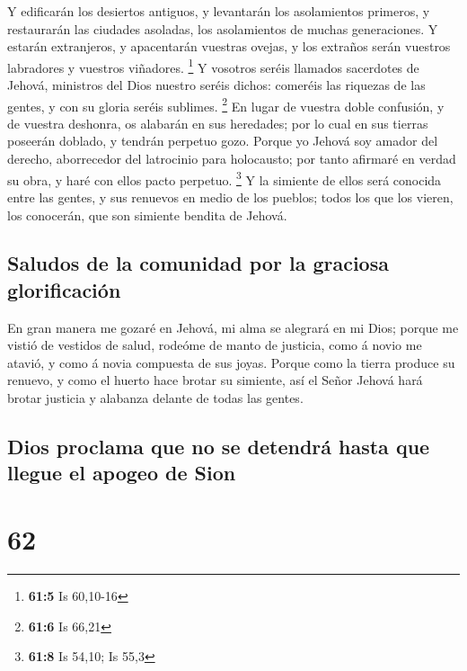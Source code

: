  Y edificarán los desiertos antiguos, y levantarán los
asolamientos primeros, y restaurarán las ciudades asoladas, los
asolamientos de muchas generaciones.  Y estarán extranjeros,
y apacentarán vuestras ovejas, y los extraños serán vuestros labradores
y vuestros viñadores. \footnote{\textbf{61:5} Is 60,10-16} 
Y vosotros seréis llamados sacerdotes de Jehová, ministros del Dios
nuestro seréis dichos: comeréis las riquezas de las gentes, y con su
gloria seréis sublimes. \footnote{\textbf{61:6} Is 66,21} 
En lugar de vuestra doble confusión, y de vuestra deshonra, os alabarán
en sus heredades; por lo cual en sus tierras poseerán doblado, y tendrán
perpetuo gozo.  Porque yo Jehová soy amador del derecho,
aborrecedor del latrocinio para holocausto; por tanto afirmaré en verdad
su obra, y haré con ellos pacto perpetuo. \footnote{\textbf{61:8} Is
  54,10; Is 55,3}  Y la simiente de ellos será conocida
entre las gentes, y sus renuevos en medio de los pueblos; todos los que
los vieren, los conocerán, que son simiente bendita de Jehová.

\hypertarget{saludos-de-la-comunidad-por-la-graciosa-glorificaciuxf3n}{%
\subsection{Saludos de la comunidad por la graciosa
glorificación}\label{saludos-de-la-comunidad-por-la-graciosa-glorificaciuxf3n}}

 En gran manera me gozaré en Jehová, mi alma se alegrará en
mi Dios; porque me vistió de vestidos de salud, rodeóme de manto de
justicia, como á novio me atavió, y como á novia compuesta de sus joyas.
 Porque como la tierra produce su renuevo, y como el huerto
hace brotar su simiente, así el Señor Jehová hará brotar justicia y
alabanza delante de todas las gentes.

\hypertarget{dios-proclama-que-no-se-detendruxe1-hasta-que-llegue-el-apogeo-de-sion}{%
\subsection{Dios proclama que no se detendrá hasta que llegue el apogeo
de
Sion}\label{dios-proclama-que-no-se-detendruxe1-hasta-que-llegue-el-apogeo-de-sion}}

\hypertarget{section-61}{%
\section{62}\label{section-61}}

